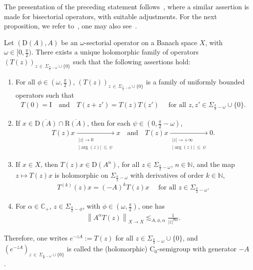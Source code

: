 \documentclass[AHL,Unicode,longabstracts,published]{cedram}
\newcommand{\bbC}{\mathbb{C}}
\newcommand{\bbN}{\mathbb{N}}
\newcommand{\rmD}{\mathrm{D}}
\newcommand{\rmC}{\mathrm{C}}
\newcommand{\rmR}{\mathrm{R}}
\newcommand{\rmI}{\mathrm{I}}
\begin{document}
The presentation of the preceding statement follows~\cite[Proposition~3.2.2]{EgertPhDThesis2015}, where a similar assertion is made for bisectorial operators, with suitable adjustments. For the next proposition, we refer to~\cite[Proposition~3.4.1]{bookHaase2006}, one may also see~\cite[Proposition~3.7.2,~Theorem~3.7.11]{ArendtBattyHieberNeubranker2011}.

\begin{prop}\label{prop:holoSemigrp}
Let $(\rmD(A),A)$ be an $\omega$-sectorial operator on a Banach space $X$, with $\omega\in[0,\frac{\pi}{2})$. There exists a unique holomorphic family of operators $(T(z))_{z\,\in\,\Sigma_{\frac{\pi}{2}-\omega}\cup\{0\}}$ such that the following assertions hold:
\begin{enumerate}
\item\label{prop1.5.1} For all $\phi\in(\omega,\frac{\pi}{2})$, $(T(z))_{z\,\in\,\Sigma_{\frac{\pi}{2}-\phi}\cup\{0\}}$ is a family of uniformly bounded operators such that
\begin{align*}
T(0)=\rmI \quad\text{and}\quad T(z+z')=T(z)T(z')\quad\text{ for all } z,z'\in\Sigma_{\frac{\pi}{2}-\omega}\cup\{0\}.
\end{align*}
\item\label{prop1.5.2} If $x\in\overline{\rmD(A)}\cap \overline{\rmR(A)}$, then for each $\psi\in(0,\frac{\pi}{2}-\omega)$,
\begin{align*}
T(z)x \xrightarrow[\substack{| z|\rightarrow 0\\
|\arg(z)| \,\leqslant\,\psi}]{} x \quad\text{and}\quad T(z)x \xrightarrow[\substack{| z|\rightarrow +\infty\\
|\arg(z)|\,\leqslant\,\psi}]{} 0 .
\end{align*}
\item\label{prop1.5.3} If $x\in X$, then $T(z)x\in\rmD(A^n)$, for all $z\in\Sigma_{\frac{\pi}{2}-\omega}$, $n\in\bbN $, and the map $z\longmapsto T(z)x$ is holomorphic on $\Sigma_{\frac{\pi}{2}-\omega}$ with derivatives of order $k\in\bbN $,
\begin{align*}
T^{(k)}(z)x = (-A)^kT(z)x\quad\text{ for all } z\in\Sigma_{\frac{\pi}{2}-\omega}.
\end{align*}
\item\label{prop1.5.4} For $\alpha\in\bbC_+$, $z\in\Sigma_{\frac{\pi}{2}-\phi}$, with $\phi\in(\omega,\frac{\pi}{2})$, one has
\begin{align*}
\left\| A^{\alpha}T(z)\right\|_{X\rightarrow X} \lesssim_{A,\phi,\alpha} \frac{1}{| z|^{\Re\alpha}}.
\end{align*}
\end{enumerate}
Therefore, one writes $e^{-zA}:=T(z)$ for all $z\in\Sigma_{\frac{\pi}{2}-\omega}\cup\{0\}$, and $(e^{-zA})_{z\,\in\,\Sigma_{\frac{\pi}{2}-\omega}\cup\{0\}}$ is called the (holomorphic) $\rmC _0$-semigroup with generator $-A$.
\end{prop}
\end{document}
